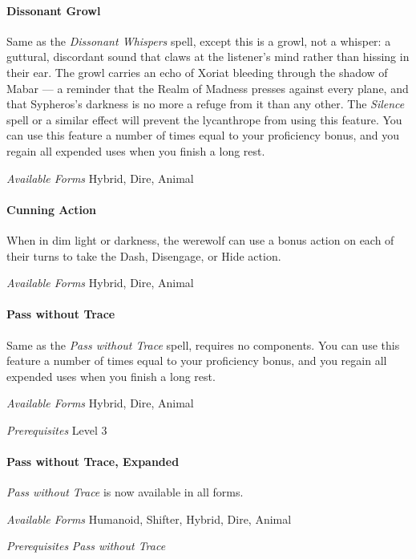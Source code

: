 \documentclass[twocolumn]{dndbook}
\begin{document}
\paragraph*{Dissonant Growl}
Same as the \emph{Dissonant Whispers} spell, except this is a growl, not a whisper: a guttural, discordant sound that claws at the listener's mind rather than hissing in their ear.
The growl carries an echo of Xoriat bleeding through the shadow of Mabar --- a reminder that the Realm of Madness presses against every plane, and that Sypheros's darkness is no more a refuge from it than any other.
The \emph{Silence} spell or a similar effect will prevent the lycanthrope from using this feature.
You can use this feature a number of times equal to your proficiency bonus, and you regain all expended uses when you finish a long rest.\par
\emph{Available Forms} Hybrid, Dire, Animal\par

\paragraph*{Cunning Action}
When in dim light or darkness, the werewolf can use a bonus action on each of their turns to take the Dash, Disengage, or Hide action.\par
\emph{Available Forms} Hybrid, Dire, Animal\par

\paragraph*{Pass without Trace}
Same as the \emph{Pass without Trace} spell, requires no components.
You can use this feature a number of times equal to your proficiency bonus, and you regain all expended uses when you finish a long rest.\par
\emph{Available Forms} Hybrid, Dire, Animal\par
\emph{Prerequisites} Level 3\par

\paragraph*{Pass without Trace, Expanded}
\emph{Pass without Trace} is now available in all forms.\par
\emph{Available Forms} Humanoid, Shifter, Hybrid, Dire, Animal\par
\emph{Prerequisites} \emph{Pass without Trace}\par
\end{document}
